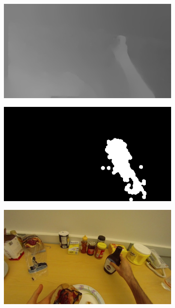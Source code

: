 \documentclass[10pt,twocolumn,hidelinks,letterpaper]{article}
\begin{document}
\begin{figure}
\begin{subfigure}{.24\linewidth}
  \end{subfigure}
  \begin{subfigure}{.24\linewidth}
  	\includegraphics[width=\linewidth]{images/img_comp/flow_y_00011.png}
  \end{subfigure}
  \begin{subfigure}{.24\linewidth}
  	\includegraphics[width=\linewidth]{images/img_comp/map0011.png}
  \end{subfigure}
  \begin{subfigure}{.24\linewidth}
  	\includegraphics[width=\linewidth]{images/img_comp/rgb0020.png}

\end{subfigure}
\end{figure}
\end{document}
